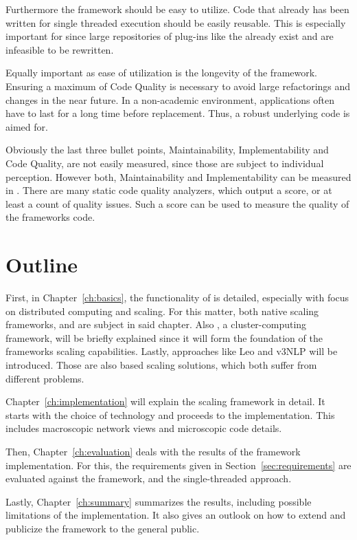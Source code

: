 Furthermore the framework should be easy to utilize. Code that already has been written for single threaded execution should be easily reusable. This is especially important for \uima{} since large repositories of plug-ins like the \dkpro{} \cite{dkpro} already exist and are infeasible to be rewritten. 

Equally important as ease of utilization is the longevity of the framework. Ensuring a maximum of Code Quality is necessary to avoid large refactorings and \api{} changes in the near future. In a non-academic environment, applications often have to last for a long time before replacement. Thus, a robust underlying code is aimed for.

Obviously the last three bullet points, Maintainability, Implementability and Code Quality, are not easily measured, since those are subject to individual perception. However both, Maintainability and Implementability can be measured in \loc{}. There are many static code quality analyzers, which output a score, or at least a count of quality issues. Such a score can be used to measure the quality of the frameworks code.

\section{Outline}
First, in Chapter~\ref{ch:basics}, the functionality of \uima{} is detailed, especially with focus on distributed computing and scaling. For this matter, both native \uima{} scaling frameworks, \uimaas{} and \cpe{} are subject in said chapter. Also \spark{}, a cluster-computing framework, will be briefly explained since it will form the foundation of the frameworks scaling capabilities. Lastly, approaches like Leo and v3NLP will be introduced. Those are also \uima{} based scaling solutions, which both suffer from different problems.

Chapter~\ref{ch:implementation} will explain the scaling framework in detail. It starts with the choice of technology and proceeds to the implementation. This includes macroscopic network views and microscopic code details.

Then, Chapter~\ref{ch:evaluation} deals with the results of the framework implementation. For this, the requirements given in Section~\ref{sec:requirements} are evaluated against the framework, \uimaas{} and the single-threaded approach.

Lastly, Chapter~\ref{ch:summary} summarizes the results, including possible limitations of the implementation. It also gives an outlook on how to extend and publicize the framework to the general public.